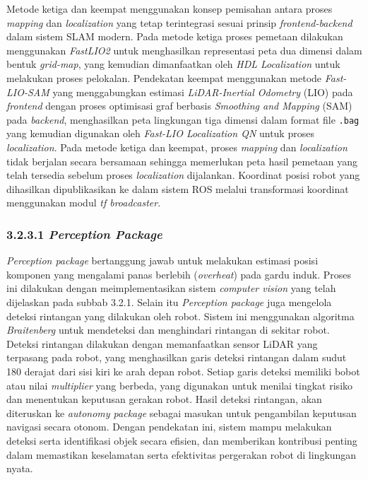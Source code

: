Metode ketiga dan keempat menggunakan konsep pemisahan antara proses \emph{mapping} dan \emph{localization} yang tetap terintegrasi sesuai prinsip \emph{frontend-backend} dalam sistem SLAM modern. Pada metode ketiga proses pemetaan dilakukan menggunakan \emph{FastLIO2} untuk menghasilkan representasi peta dua dimensi dalam bentuk \emph{grid-map}, yang kemudian dimanfaatkan oleh \emph{HDL Localization} untuk melakukan proses pelokalan. Pendekatan keempat menggunakan metode \emph{Fast-LIO-SAM} yang menggabungkan estimasi \emph{LiDAR-Inertial Odometry} (LIO) pada \emph{frontend} dengan proses optimisasi graf berbasis \emph{Smoothing and Mapping} (SAM) pada \emph{backend}, menghasilkan peta lingkungan tiga dimensi dalam format file \texttt{.bag} yang kemudian digunakan oleh \emph{Fast-LIO Localization QN} untuk proses \emph{localization}. Pada metode ketiga dan keempat, proses \emph{mapping} dan \emph{localization} tidak berjalan secara bersamaan sehingga memerlukan peta hasil pemetaan yang telah tersedia sebelum proses \emph{localization} dijalankan. Koordinat posisi robot yang dihasilkan dipublikasikan ke dalam sistem ROS melalui transformasi koordinat menggunakan modul \emph{tf broadcaster}.

\subsubsection{3.2.3.1 \emph{Perception Package}}
\emph{Perception package} bertanggung jawab untuk melakukan estimasi posisi komponen yang mengalami panas berlebih (\emph{overheat}) pada gardu induk. Proses ini dilakukan dengan meimplementasikan sistem \emph{computer vision} yang telah dijelaskan pada subbab 3.2.1.  Selain itu \emph{Perception package} juga mengelola deteksi rintangan yang dilakukan oleh robot. Sistem ini menggunakan algoritma \emph{Braitenberg} untuk mendeteksi dan menghindari rintangan di sekitar robot. Deteksi rintangan dilakukan dengan memanfaatkan sensor LiDAR yang terpasang pada robot, yang menghasilkan garis deteksi rintangan dalam sudut 180 derajat dari sisi kiri ke arah depan robot. Setiap garis deteksi memiliki bobot atau nilai \emph{multiplier} yang berbeda, yang digunakan untuk menilai tingkat risiko dan menentukan keputusan gerakan robot. Hasil  deteksi rintangan, akan diteruskan ke \emph{autonomy package} sebagai masukan untuk pengambilan keputusan navigasi secara otonom. Dengan pendekatan ini, sistem mampu melakukan deteksi serta identifikasi objek secara efisien, dan memberikan kontribusi penting dalam memastikan keselamatan serta efektivitas pergerakan robot di lingkungan nyata.

